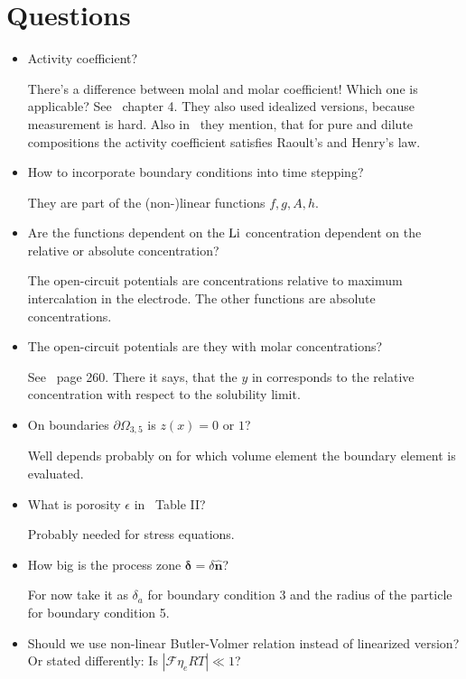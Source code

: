 \documentclass[a4paper,11pt]{scrartcl}
\newcommand*{\Li}{\ce{Li}}
\newcommand*{\F}{\mathcal{F}}
\begin{document}
\section{Questions}
\begin{itemize}
\item Activity coefficient?

  There's a difference between molal and molar coefficient! Which one is applicable?
  See~\cite{doyle95} chapter 4.
  They also used idealized versions, because measurement is hard.
  Also in~\cite{garcia05} they mention, that for pure and dilute compositions
  the activity coefficient satisfies Raoult's and Henry's law.

\item How to incorporate boundary conditions into time stepping?

  They are part of the (non-)linear functions $f, g, A, h$.

\item Are the functions dependent on the $\Li$ concentration dependent on the
  relative or absolute concentration?

  The open-circuit potentials are concentrations relative to maximum
  intercalation in the electrode.
  The other functions are absolute concentrations.

\item The open-circuit potentials are they with molar concentrations?

  See~\cite{garcia05} page 260.
  There it says, that the $y$ in  corresponds to the relative
  concentration with respect to the solubility limit.

\item On boundaries $\partial\Omega_{3,5}$ is $z(x) = 0$ or $1$?

  Well depends probably on for which volume element the boundary element is evaluated.

\item What is porosity $\epsilon$ in~\cite{garcia05} Table II?

  Probably needed for stress equations.

\item How big is the process zone $\boldsymbol{\delta} = \delta \boldsymbol{\hat{n}}$?

  For now take it as $\delta_a$ for boundary condition 3 and the radius of the
  particle for boundary condition 5.

\item Should we use non-linear Butler-Volmer relation instead of linearized version?
  Or stated differently: Is $|\F \eta_e R T| \ll 1$?


\end{itemize}
\end{document}
